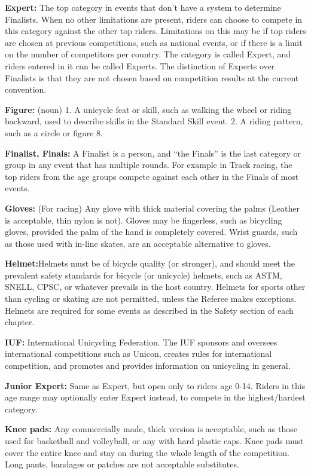 \textbf{Expert:} The top category in events that don't have a system to determine Finalists.
When no other limitations are present, riders can choose to compete in this category against the other top riders.
Limitations on this may be if top riders are chosen at previous competitions, such as national events, or if there is a limit on the number of competitors per country.
The category is called Expert, and riders entered in it can be called Experts.
The distinction of Experts over Finalists is that they are not chosen based on competition results at the current convention.

\textbf{Figure:} (noun) 1. A unicycle feat or skill, such as walking the wheel or riding backward, used to describe skills in the Standard Skill event.
2. A riding pattern, such as a circle or figure 8.

\textbf{Finalist, Finals:} A Finalist is a person, and ``the Finals'' is the last category or group in any event that has multiple rounds.
For example in Track racing, the top riders from the age groups compete against each other in the Finals of most events.

\textbf{Gloves:} (For racing) Any glove with thick material covering the palms (Leather is acceptable, thin nylon is not).
Gloves may be fingerless, such as bicycling gloves, provided the palm of the hand is completely covered.
Wrist guards, such as those used with in-line skates, are an acceptable alternative to gloves.

\textbf{Helmet:}Helmets must be of bicycle quality (or stronger), and should meet the prevalent safety standards for bicycle (or unicycle) helmets, such as ASTM, SNELL, CPSC, or whatever prevails in the host country.
Helmets for sports other than cycling or skating are not permitted, unless the Referee makes exceptions.
Helmets are required for some events as described in the Safety section of each chapter.

\textbf{IUF:} International Unicycling Federation.
The IUF sponsors and oversees international competitions such as Unicon, creates rules for international competition, and promotes and provides information on unicycling in general.

\textbf{Junior Expert:} Same as Expert, but open only to riders age 0-14.
Riders in this age range may optionally enter Expert instead, to compete in the highest/hardest category.

\textbf{Knee pads:} Any commercially made, thick version is acceptable, such as those used for basketball and volleyball, or any with hard plastic caps.
Knee pads must cover the entire knee and stay on during the whole length of the competition.
Long pants, bandages or patches are not acceptable substitutes.

